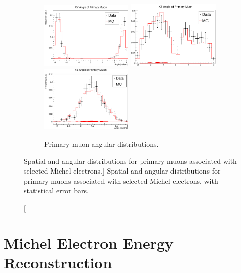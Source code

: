 \begin{figure}
	\begin{subfigure}[b]{\textwidth}
		\centering
		\vspace{5mm}
		\includegraphics[width=0.484\textwidth]{figures/DataVMC_angle_xy.pdf}
		\hfill
		\includegraphics[width=0.484\textwidth]{figures/DataVMC_angle_xz.pdf}
		\includegraphics[width=0.484\textwidth]{figures/DataVMC_angle_yz.pdf}
		\caption {Primary muon angular distributions.}
		\label{fig:muon_angles}
	\end{subfigure}


	\caption
	[Spatial and angular distributions for primary muons associated with selected
	Michel electrons.]
	{Spatial and angular distributions for primary muons associated with selected
	Michel electrons, with statistical error bars.}

	\label{fig:muon_distributions}

\end{figure}

\section{Michel Electron Energy Reconstruction} \label{ME_R}

